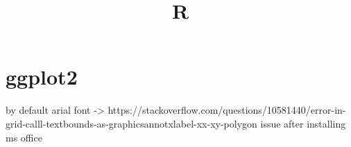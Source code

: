 


\title{R}


\date{}


\maketitle

\justify

\renewcommand{\abstractname}{}

\begin{abstract}

\end{abstract}


\section*{ggplot2}

by default arial font -> https://stackoverflow.com/questions/10581440/error-in-grid-calll-textbounds-as-graphicsannotxlabel-xx-xy-polygon
issue after installing ms office







%
%



